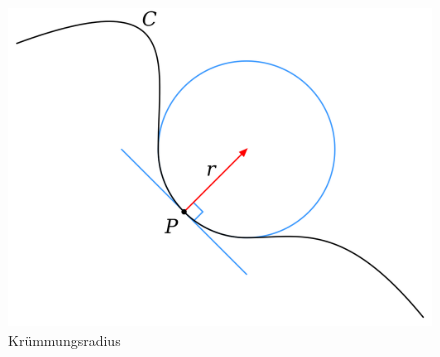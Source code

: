 \begin{refsection}




\begin{figure} 
  \centering
  \includegraphics[scale=0.2]{minimal/Kruemmungsradius.png}
  \caption{Krümmungsradius} 
  \label{Kruemmungsradius}
\end{figure}






\end{refsection}
